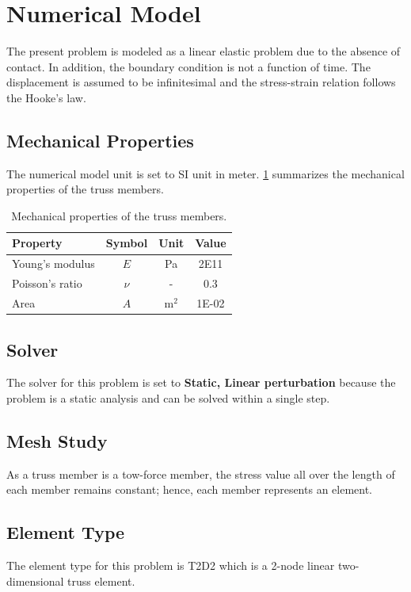\documentclass{article}
\begin{document}
\section{Numerical Model}
The present problem is modeled as a linear elastic problem due to the absence of contact. In addition, the boundary condition is not a function of time. The displacement is assumed to be infinitesimal and the stress-strain relation follows the Hooke's law.

\subsection{Mechanical Properties}
The numerical model unit is set to SI unit in meter. \cref{tab:mat_prop_truss} summarizes the mechanical properties of the truss members.

\begin{table}[H]
    \centering
    \caption{Mechanical properties of the truss members.}
    \begin{tabular}{l c c c} \hline
        Property & Symbol & Unit & Value \\ \hline
        Young's modulus & $E$& Pa & 2E11 \\
        Poisson's ratio & $\nu$ & - & 0.3 \\
        Area & $A$ & m$^2$ & 1E-02 \\ \hline
    \end{tabular} 
    \label{tab:mat_prop_truss}
\end{table}

\subsection{Solver}
The solver for this problem is set to \textbf{Static, Linear perturbation} because the problem is a static analysis and can be solved within a single step.

\subsection{Mesh Study}
As a truss member is a tow-force member, the stress value all over the length of each member remains constant; hence, each member represents an element.

\subsection{Element Type}
The element type for this problem is T2D2 which is a 2-node linear two-dimensional truss element.
\end{document}
